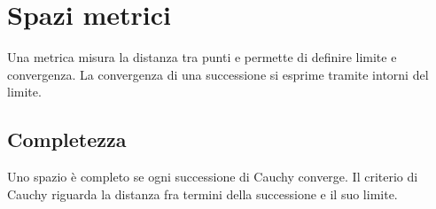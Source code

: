 \section{Spazi metrici}
\label{sec:metrica}
Una metrica misura la distanza tra punti e permette di definire limite e convergenza.
La convergenza di una successione si esprime tramite intorni del limite.

\subsection{Completezza}
Uno spazio è completo se ogni successione di Cauchy converge.
Il criterio di Cauchy riguarda la distanza fra termini della successione e il suo limite.
